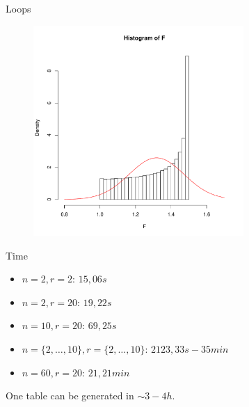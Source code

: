 \documentclass{beamer}
\begin{document}
\begin{frame}{Loops}
\begin{figure}
\begin{overprint}
\centerline{\includegraphics[width=8cm]{Primer_1e+7.pdf}}

\end{overprint}
\end{figure}

\end{frame}

\begin{frame}{Time}
\begin{itemize}
\item $n=2, r=2$: $15,06s$
\item $n=2, r=20$: $19,22s$
\item $n=10,r=20$: $69,25s$
\item $n=\{2,\dots,10\},  r=\{2, \dots,10\}$: $2123,33s -35min$
\item $n=60, r=20$: $21,21min$
\end{itemize}
One table can be generated in $\sim 3-4h.$
\end{frame}
\end{document}
